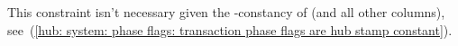 This constraint isn't necessary given the \hubStamp-constancy of \txExec{} (and all other  columns),
see~(\ref{hub: system: phase flags: transaction phase flags are hub stamp constant}).
